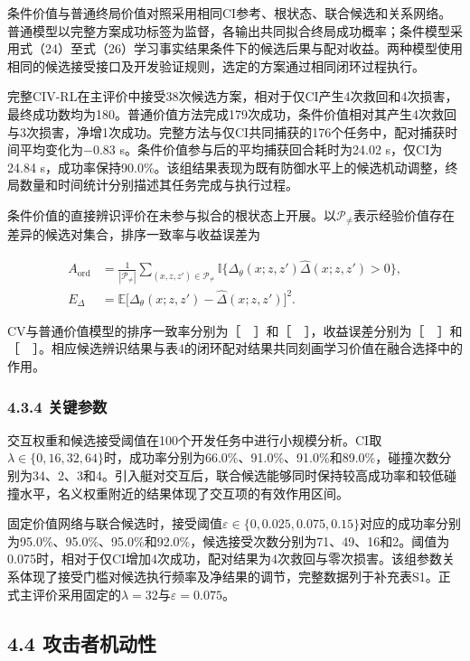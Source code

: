 \documentclass[UTF8,10.5pt,a4paper,fontset=none]{ctexart}
\begin{document}
条件价值与普通终局价值对照采用相同CI参考、根状态、联合候选和关系网络。普通模型以完整方案成功标签为监督，各输出共同拟合终局成功概率；条件模型采用式（24）至式（26）学习事实结果条件下的候选后果与配对收益。两种模型使用相同的候选接受接口及开发验证规则，选定的方案通过相同闭环过程执行。

完整CIV-RL在主评价中接受38次候选方案，相对于仅CI产生4次救回和4次损害，最终成功数均为180。普通价值方法完成179次成功，条件价值相对其产生4次救回与3次损害，净增1次成功。完整方法与仅CI共同捕获的176个任务中，配对捕获时间平均变化为\(-0.83\)
s。条件价值参与后的平均捕获回合耗时为24.02 s，仅CI为24.84
s，成功率保持90.0\%。该组结果表现为既有防御水平上的候选机动调整，终局数量和时间统计分别描述其任务完成与执行过程。

条件价值的直接辨识评价在未参与拟合的根状态上开展。以\(\mathcal P_{\ne}\)表示经验价值存在差异的候选对集合，排序一致率与收益误差为

\[
\begin{aligned}
A_{\mathrm{ord}}&=\frac{1}{|\mathcal P_{\ne}|}
\sum_{(x,z,z')\in\mathcal P_{\ne}}
\mathbb I\{\Delta_\theta(x;z,z')\widehat\Delta(x;z,z')>0\},\\
E_\Delta&=\mathbb E
\bigl[\Delta_\theta(x;z,z')-\widehat\Delta(x;z,z')\bigr]^2.
\end{aligned}
\tag{34}
\]

CV与普通价值模型的排序一致率分别为［　］和［　］，收益误差分别为［　］和［　］。相应候选辨识结果与表4的闭环配对结果共同刻画学习价值在融合选择中的作用。

\subsubsection{4.3.4 关键参数}\label{ux5173ux952eux53c2ux6570}

交互权重和候选接受阈值在100个开发任务中进行小规模分析。CI取\(\lambda\in\{0,16,32,64\}\)时，成功率分别为66.0\%、91.0\%、91.0\%和89.0\%，碰撞次数分别为34、2、3和4。引入艇对交互后，联合候选能够同时保持较高成功率和较低碰撞水平，名义权重附近的结果体现了交互项的有效作用区间。

固定价值网络与联合候选时，接受阈值\(\varepsilon\in\{0,0.025,0.075,0.15\}\)对应的成功率分别为95.0\%、95.0\%、95.0\%和92.0\%，候选接受次数分别为71、49、16和2。阈值为0.075时，相对于仅CI增加4次成功，配对结果为4次救回与零次损害。该组参数关系体现了接受门槛对候选执行频率及净结果的调节，完整数据列于补充表S1。正式主评价采用固定的\(\lambda=32\)与\(\varepsilon=0.075\)。

\subsection{4.4
攻击者机动性}\label{ux653bux51fbux8005ux673aux52a8ux6027}
\end{document}
